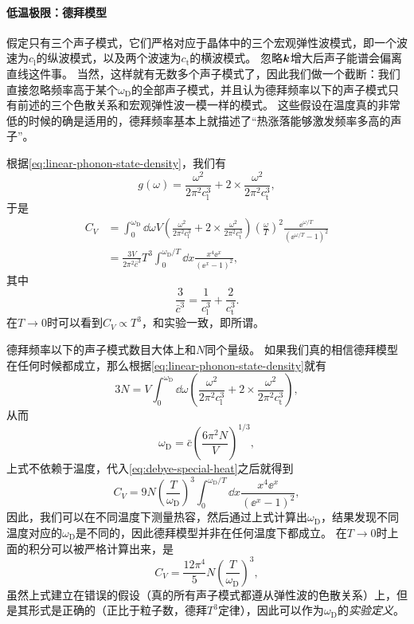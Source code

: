\paragraph{低温极限：德拜模型} 假定只有三个声子模式，它们严格对应于晶体中的三个宏观弹性波模式，即一个波速为$c_\text{l}$的纵波模式，以及两个波速为$c_\text{t}$的横波模式。
忽略$\vb*{k}$增大后声子能谱会偏离直线这件事。
当然，这样就有无数多个声子模式了，因此我们做一个截断：我们直接忽略频率高于某个$\omega_\text{D}$的全部声子模式，并且认为德拜频率以下的声子模式只有前述的三个色散关系和宏观弹性波一模一样的模式。
这些假设在温度真的非常低的时候的确是适用的，德拜频率基本上就描述了“热涨落能够激发频率多高的声子”。

根据\eqref{eq:linear-phonon-state-density}，我们有
\begin{equation}
    g(\omega) = \frac{\omega^2}{2\pi^2 c_\text{l}^3} + 2 \times \frac{\omega^2}{2\pi^2 c_\text{t}^3},
\end{equation}
于是
\begin{equation}
    \begin{aligned}
        C_V &= \int_0^{\omega_\text{D}} \dd{\omega} V \left( \frac{\omega^2}{2\pi^2 c_\text{l}^3} + 2 \times \frac{\omega^2}{2\pi^2 c_\text{t}^3} \right) \left( \frac{\omega}{T} \right)^2 \frac{\ee^{\omega / T}}{(\ee^{\omega / T} - 1)^2} \\
        &= \frac{3V}{2\pi^2 \bar{c}^3} T^3 \int_0^{\omega_\text{D} / T} \dd{x} \frac{x^4 \ee^{x}}{(\ee^x - 1)^2} ,
    \end{aligned}
    \label{eq:debye-special-heat}
\end{equation}
其中
\begin{equation}
    \frac{3}{\bar{c}^3} = \frac{1}{c_\text{l}^3} + \frac{2}{c_\text{t}^3}.
\end{equation}
在$T \to 0$时可以看到$C_V \propto T^3$，和实验一致，即所谓。

德拜频率以下的声子模式数目大体上和$N$同个量级。
如果我们真的相信德拜模型在任何时候都成立，那么根据\eqref{eq:linear-phonon-state-density}就有
\[
    3N = V \int_0^{\omega_\text{D}} \dd{\omega} \left( \frac{\omega^2}{2\pi^2 c_\text{l}^3} + 2 \times \frac{\omega^2}{2\pi^2 c_\text{t}^3} \right),
\]
从而
\begin{equation}
    \omega_\text{D} = \bar{c} \left( \frac{6 \pi^2 N}{V} \right)^{1/3}, 
    \label{eq:}
\end{equation}
上式不依赖于温度，代入\eqref{eq:debye-special-heat}之后就得到
\begin{equation}
    C_V = 9 N \left(\frac{T}{\omega_\text{D}}\right)^3 \int_0^{\omega_\text{D} / T} \dd{x} \frac{x^4 \ee^{x}}{(\ee^x - 1)^2} ,
\end{equation}
因此，我们可以在不同温度下测量热容，然后通过上式计算出$\omega_\text{D}$，结果发现不同温度对应的$\omega_\text{D}$是不同的，因此德拜模型并非在任何温度下都成立。
在$T \to 0$时上面的积分可以被严格计算出来，是
\begin{equation}
    C_V = \frac{12 \pi^4}{5} N \left( \frac{T}{\omega_\text{D}} \right)^3,
\end{equation}
虽然上式建立在错误的假设（真的所有声子模式都遵从弹性波的色散关系）上，但是其形式是正确的（正比于粒子数，德拜$T^3$定律），因此可以作为$\omega_\text{D}$的\emph{实验定义}。

